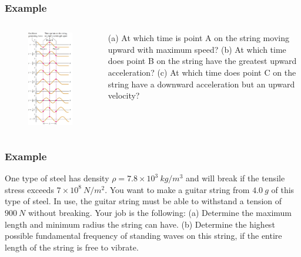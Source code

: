 \documentclass[]{beamer}
\begin{document}
 \begin{frame}
  \frametitle{Example \theexample}

\begin{columns}[c]
\column{2in}  %

\begin{figure}[h!]
  \begin{center}
    \includegraphics[height=3.in]{images4/EX1.jpg}
  \end{center}
\end{figure}



\column{2in}



(a) At which time is point A on the string moving upward with maximum speed?
(b) At which time does point B on the string have the greatest upward acceleration?
(c) At which time does point C on the string have a downward acceleration but an
upward velocity?



\end{columns}

\end{frame}

  \begin{frame}
    \frametitle{Example \theexample}

 One type of steel has density $\rho=7.8\times 10^3~kg/m^3$ and
will break if the tensile stress exceeds $7\times 10^8~N/m^2$. You want
to make a guitar string from $4.0 ~g$ of this type of steel. In use, the
guitar string must be able to withstand a tension of $900 ~N$ without
breaking. Your job is the following: (a) Determine the maximum
length and minimum radius the string can have. (b) Determine the
highest possible fundamental frequency of standing waves on this
string, if the entire length of the string is free to vibrate.

\end{frame}
\end{document}
